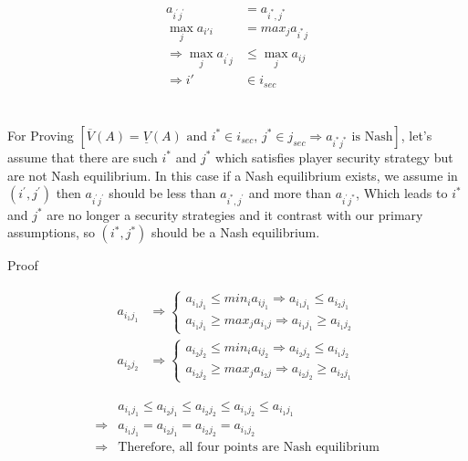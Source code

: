 \documentclass[
  course = {{IE579 Game Theory and Multi-Agent Reinforcement Learning}},
  assignment = 1,
  name = {{Mohammad Mahdi Rahimi}},
  studentnumber = {{20208244}},
  email = {{mahi@kaist.ac.kr}},
  firstexercise = 1
]{aga-homework}
\begin{document}
\begin{equation}
    \begin{split}
        a_{i^\prime j^\prime} & = a_{i^*, j^*} \\
        \max_j{a_{i\prime i}} & = max_j{a_{i^* j}}\\
        \Rightarrow \max_j{a_{i^\prime j}} & \le \max_j{a_{ij}}\\
        \Rightarrow i\prime & \in i_{sec}
    \end{split}
\end{equation}
\\
\\
For Proving $[\overline{V}(A) = \underline{V}(A)\text{ and  } i^* \in i_{sec}\text{, } j^* \in j_{sec} \Rightarrow a_{i^* j^* }\text{ is Nash}]$, let's assume that there are such $i^*$ and $j^*$ which satisfies player security strategy but are not Nash equilibrium. In this case if a Nash equilibrium exists, we assume in $(i^\prime, j^\prime)$ then $a_{i^\prime j^\prime}$ should be less than $a_{i^*, j^\prime}$ and more than $a_{i^\prime j^*}$, Which leads to $i^*$ and $j^*$ are no longer a security strategies and it contrast with our primary assumptions, so $(i^*, j^*)$ should be a Nash equilibrium.

\subexercise Proof

\begin{equation}
    \begin{split}
        a_{i_1j_1} & \Rightarrow \begin{cases}
        a_{i_1j_1} \le min_i{a_{ij_1}} \Rightarrow a_{i_1j_1} \le a_{i_2j_1}\\
        a_{i_1j_1} \ge max_j{a_{i_1j}} \Rightarrow a_{i_1j_1} \ge a_{i_1j_2}
        \end{cases}\\
        a_{i_2j_2} & \Rightarrow \begin{cases}
        a_{i_2j_2} \le min_i{a_{ij_2}} \Rightarrow a_{i_2j_2} \le a_{i_1j_2}\\
        a_{i_2j_2} \ge max_j{a_{i_2j}} \Rightarrow a_{i_2j_2} \ge a_{i_2j_1}
        \end{cases}
    \end{split}
\end{equation}

\begin{equation}
    \begin{split}
         & a_{i_1j_1} \le  a_{i_2j_1} \le  a_{i_2j_2} \le  a_{i_1j_2} \le  a_{i_1j_1}\\
         \Rightarrow & a_{i_1j_1} =  a_{i_2j_1} =  a_{i_2j_2} =  a_{i_1j_2}\\
         \Rightarrow & \text{Therefore, all four points are Nash equilibrium}
    \end{split}
\end{equation}
\end{document}
